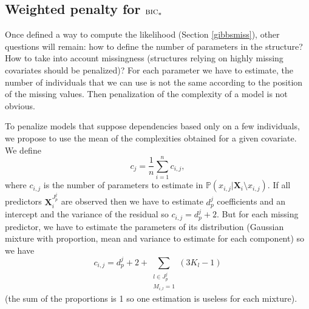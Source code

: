 \documentclass[12pt,a4paper]{report}
\begin{document}
	\subsection{Weighted penalty for $\mbox{{\sc bic}}_*$}
			Once defined a way to compute the likelihood (Section \ref{gibbsmiss}), other questions will remain: how to define the number of parameters in the structure? How to take into account missingness (structures relying on highly missing covariates should be penalized)?
			For each parameter we have to estimate, the number of individuals that we can use is not the same according to the position of the missing values. Then penalization of the complexity of a model is not obvious.
			
			To penalize models that suppose dependencies based only on a few individuals, we propose to use the mean of the complexities obtained for a given covariate. We define
			\begin{equation}
			c_j=\frac{1}{n}\sum_{i=1}^nc_{i,j},  \nonumber 
\end{equation}						where $c_{i,j}$ is the number of parameters to estimate in $\mathbb{P}(x_{i,j}|\boldsymbol{X}_i\setminus x_{i,j})$. If all predictors $\boldsymbol{X}^{J_p^j}_i$ are observed then we have to estimate $d_p^j$ coefficients and an intercept and the variance of the residual so  $c_{i,j}=d_p^j+2$. But for each missing predictor, we have to estimate the parameters of its distribution (Gaussian mixture with proportion, mean and variance to estimate for each component) so we have $$c_{i,j}=d_p^j+2 + \sum_{\substack{l \in J_p^j \\ M_{i,l}=1}} (3 K_l-1)$$  (the sum of the proportions is 1 so one estimation is useless for each mixture).
\end{document}
